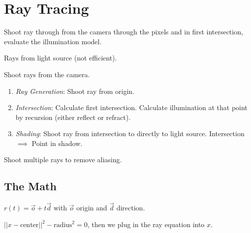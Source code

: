 \section{Ray Tracing}

\begin{definition}
  Shoot ray through from the camera through the pixels and in first intersection, evaluate the illumination model.
\end{definition}

\begin{definition}
  Rays from light source (not efficient).
\end{definition}

\begin{definition}
  Shoot rays from the camera.
\end{definition}

\begin{definition}
  \begin{enumerate}
    \item \textit{Ray Generation}: Shoot ray from origin.
    \item \textit{Intersection}: Calculate first intersection. Calculate illumination at that point by recursion (either reflect or refract).
    \item \textit{Shading}: Shoot ray from intersection to directly to light source. Intersection \(\implies\) Point in shadow.
  \end{enumerate}
\end{definition}

\begin{definition}[Supersampling]
  Shoot multiple rays to remove aliasing.
\end{definition}

\subsection{The Math}

\begin{definition}
  \(r(t) = \vec{o} + t \vec{d}\) with \(\vec{o}\) origin and \(\vec{d}\) direction.
\end{definition}

\begin{definition}
  \(||x - \text{center}||^2 - \text{radius}^2 = 0\), then we plug in the ray equation into \(x\).
\end{definition}

